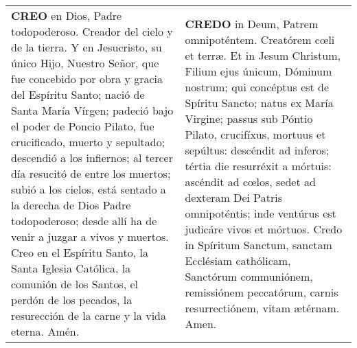 \documentclass[./rosary.tex]{subfiles}
\begin{document}
\label{creed}
\begin{longtable} { p{} p{} }
    \textbf{CREO} en Dios, Padre todopoderoso. Creador del cielo y de la tierra. Y en Jesucristo, su único Hijo, Nuestro Señor,
    que fue concebido por obra y gracia del Espíritu Santo; nació de Santa María Vírgen; padeció bajo el poder de Poncio Pilato,
    fue crucificado, muerto y sepultado; descendió a los infiernos; al tercer día resucitó de entre los muertos; subió a los cielos,
    está sentado a la derecha de Dios Padre todopoderoso; desde allí ha de venir a juzgar a vivos y muertos.
    Creo en el Espíritu Santo, la Santa Iglesia Católica, la comunión de los Santos, el perdón de los pecados,
    la resurección de la carne y la vida eterna. Amén.
    
     &

    \textbf{CREDO} in Deum, Patrem omnipoténtem. Creatórem cœli et terræ. Et in Jesum Christum, Filium ejus únicum, Dóminum nostrum;
    qui concéptus est de Spíritu Sancto; natus ex María Virgine; passus sub Póntio Pilato, crucifíxus, mortuus et sepúltus:
    descéndit ad inferos; tértia die resurréxit a mórtuis: ascéndit ad cœlos, sedet ad dexteram Dei Patris omnipoténtis;
    inde ventúrus est judicáre vivos et mórtuos. Credo in Spíritum Sanctum, sanctam Ecclésiam cathólicam, Sanctórum communiónem,
    remissiónem peccatórum, carnis resurrectiónem, vitam ætérnam. Amen.
\end{longtable}
\end{document}
